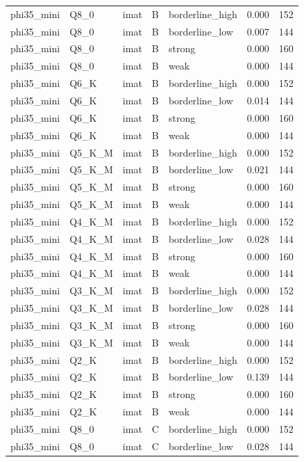 \begin{tabular}{lllllrr}
phi35\_mini & Q8\_0 & imat & B & borderline\_high & 0.000 & 152 \\
phi35\_mini & Q8\_0 & imat & B & borderline\_low & 0.007 & 144 \\
phi35\_mini & Q8\_0 & imat & B & strong & 0.000 & 160 \\
phi35\_mini & Q8\_0 & imat & B & weak & 0.000 & 144 \\
phi35\_mini & Q6\_K & imat & B & borderline\_high & 0.000 & 152 \\
phi35\_mini & Q6\_K & imat & B & borderline\_low & 0.014 & 144 \\
phi35\_mini & Q6\_K & imat & B & strong & 0.000 & 160 \\
phi35\_mini & Q6\_K & imat & B & weak & 0.000 & 144 \\
phi35\_mini & Q5\_K\_M & imat & B & borderline\_high & 0.000 & 152 \\
phi35\_mini & Q5\_K\_M & imat & B & borderline\_low & 0.021 & 144 \\
phi35\_mini & Q5\_K\_M & imat & B & strong & 0.000 & 160 \\
phi35\_mini & Q5\_K\_M & imat & B & weak & 0.000 & 144 \\
phi35\_mini & Q4\_K\_M & imat & B & borderline\_high & 0.000 & 152 \\
phi35\_mini & Q4\_K\_M & imat & B & borderline\_low & 0.028 & 144 \\
phi35\_mini & Q4\_K\_M & imat & B & strong & 0.000 & 160 \\
phi35\_mini & Q4\_K\_M & imat & B & weak & 0.000 & 144 \\
phi35\_mini & Q3\_K\_M & imat & B & borderline\_high & 0.000 & 152 \\
phi35\_mini & Q3\_K\_M & imat & B & borderline\_low & 0.028 & 144 \\
phi35\_mini & Q3\_K\_M & imat & B & strong & 0.000 & 160 \\
phi35\_mini & Q3\_K\_M & imat & B & weak & 0.000 & 144 \\
phi35\_mini & Q2\_K & imat & B & borderline\_high & 0.000 & 152 \\
phi35\_mini & Q2\_K & imat & B & borderline\_low & 0.139 & 144 \\
phi35\_mini & Q2\_K & imat & B & strong & 0.000 & 160 \\
phi35\_mini & Q2\_K & imat & B & weak & 0.000 & 144 \\
phi35\_mini & Q8\_0 & imat & C & borderline\_high & 0.000 & 152 \\
phi35\_mini & Q8\_0 & imat & C & borderline\_low & 0.028 & 144 \\

\end{tabular}
